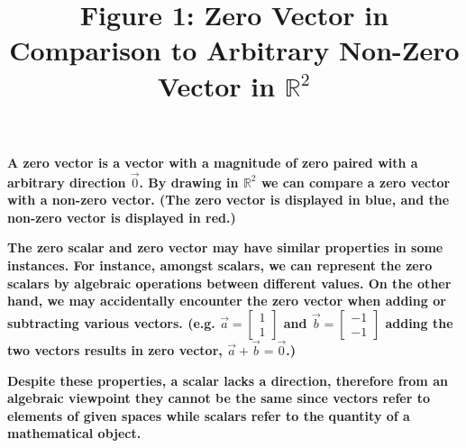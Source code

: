 \documentclass{article}
\begin{document}
	\textbf{A zero vector is a vector with a magnitude of zero paired with a arbitrary direction $\vec{0}$. By drawing in $\mathbb R^2$ we can compare a zero vector with a non-zero vector. (The zero vector is displayed in blue, and the non-zero vector is displayed in red.)}
	
\title{Figure 1: Zero Vector in Comparison to Arbitrary Non-Zero Vector in $\mathbb R^2$}
	
		
	
	\textbf{The zero scalar and zero vector may have similar properties in some instances. For instance, amongst scalars, we can represent the zero scalars by algebraic operations between different values. On the other hand, we may accidentally encounter the zero vector when adding or subtracting various vectors. (e.g. $\vec{a} = \begin{bmatrix} 1 \\ 1   \end{bmatrix} $ and $\Vec{b} = \begin{bmatrix} -1 \\ -1   \end{bmatrix}$ adding the two vectors results in zero vector, $\vec{{a}} + \vec{{b}} = \vec{{0}} $.)}
	
	\textbf{Despite these properties, a scalar lacks a direction, therefore from an algebraic viewpoint they cannot be the same since vectors refer to elements of given spaces while scalars refer to the quantity of a mathematical object.}
	
\end{document}
